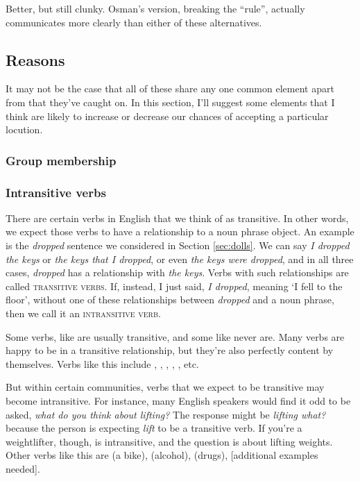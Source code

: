 Better, but still clunky. Osman's version, breaking the \enquote{rule}, actually communicates more clearly than either of these alternatives.

\subsection{Reasons}
It may not be the case that all of these share any one common element apart from that they've caught on. In this section, I'll suggest some elements that I think are likely to increase or decrease our chances of accepting a particular locution.

    \subsubsection{Group membership}
        \subsubsection*{Intransitive verbs} \label{sec:intrans}
            
            There are certain verbs in English that we think of as transitive. In other words, we expect those verbs to have a relationship to a noun phrase object. An example is the \textit{dropped} sentence we considered in Section \ref{sec:dolls}. We can say \textit{I dropped the keys} or \textit{the keys that I dropped}, or even \textit{the keys were dropped}, and in all three cases, \textit{dropped} has a relationship with \textit{the keys}. Verbs with such relationships are called \textsc{transitive verbs}. If, instead, I just said, \textit{I dropped}, meaning `I fell to the floor', without one of these relationships between \textit{dropped} and a noun phrase, then we call it an \textsc{intransitive verb}.
            
            Some verbs, like  are usually transitive, and some like  never are. Many verbs are happy to be in a transitive relationship, but they're also perfectly content by themselves. Verbs like this include , , , , , etc.
            
            But within certain communities, verbs that we expect to be transitive may become intransitive. For instance, many English speakers would find it odd to be asked, \textit{what do you think about lifting?} The response might be \textit{lifting what?} because the person is expecting \textit{lift} to be a transitive verb. If you're a weightlifter, though,  is intransitive, and the question is about lifting weights. Other verbs like this are  (a bike),  (alcohol),  (drugs), [additional examples needed].
            
